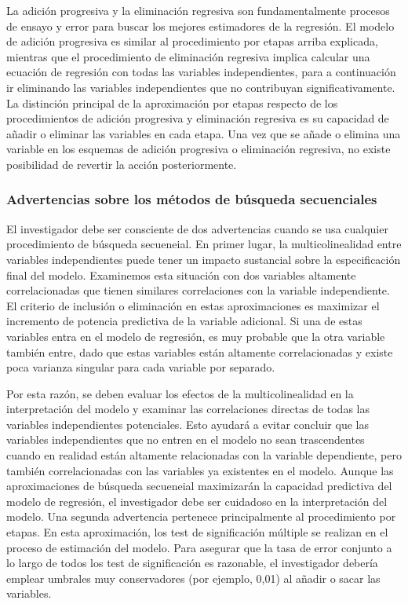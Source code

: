 \documentclass[
  12pt,
]{krantz}
\theoremstyle{definition}
\theoremstyle{definition}
\theoremstyle{definition}
\theoremstyle{remark}
\begin{document}
La adición progresiva y la eliminación regresiva son fundamentalmente procesos de ensayo y error para buscar los mejores estimadores de la regresión. El modelo de adición progresiva es similar al procedimiento por etapas arriba explicada, mientras que el procedimiento de eliminación regresiva implica calcular una ecuación de regresión con todas las variables independientes, para a continuación ir eliminando las variables independientes que no contribuyan significativamente. La distinción principal de la aproximación por etapas respecto de los procedimientos de adición progresiva y eliminación regresiva es su capacidad de añadir o eliminar las variables en cada etapa. Una vez que se añade o elimina una variable en los esquemas de adición progresiva o eliminación regresiva, no existe posibilidad de revertir la acción posteriormente.

\hypertarget{advertencias-sobre-los-metodos-de-busqueda-secuenciales}{%
\subsubsection{Advertencias sobre los métodos de búsqueda secuenciales}\label{advertencias-sobre-los-metodos-de-busqueda-secuenciales}}

El investigador debe ser consciente de dos advertencias cuando se usa cualquier procedimiento de búsqueda secueneial. En primer lugar, la multicolinealidad entre variables independientes puede tener un impacto sustancial sobre la especificación final del modelo. Examinemos esta situación con dos variables altamente correlacionadas que tienen similares correlaciones con la variable independiente. El criterio de inclusión o eliminación en estas aproximaciones es maximizar el incremento de potencia predictiva de la variable adicional. Si una de estas variables entra en el modelo de regresión, es muy probable que la otra variable también entre, dado que estas variables están altamente correlacionadas y existe poca varianza singular para cada variable por separado.

Por esta razón, se deben evaluar los efectos de la multicolinealidad en la interpretación del modelo y examinar las correlaciones directas de todas las variables independientes potenciales. Esto ayudará a evitar concluir que las variables independientes que no entren en el modelo no sean trascendentes cuando en realidad están altamente relacionadas con la variable dependiente, pero también correlacionadas con las variables ya existentes en el modelo. Aunque las aproximaciones de búsqueda secueneial maximizarán la capacidad predictiva del modelo de regresión, el investigador debe ser cuidadoso en la interpretación del modelo. Una segunda advertencia pertenece principalmente al procedimiento por etapas. En esta aproximación, los test de significación múltiple se realizan en el proceso de estimación del modelo. Para asegurar que la tasa de error conjunto a lo largo de todos los test de significación es razonable, el investigador debería emplear umbrales muy conservadores (por ejemplo, 0,01) al añadir o sacar las variables.
\end{document}
